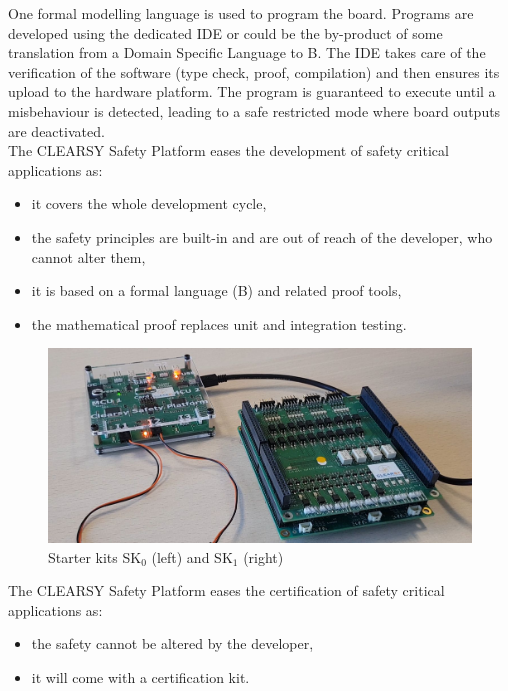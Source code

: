 One formal modelling language is used to program the board. Programs are developed using the dedicated IDE or could be the by-product of some translation from a Domain Specific Language to B. The IDE takes care of the verification of the software (type check, proof, compilation) and then ensures its upload to the hardware platform. The program is guaranteed to execute until a misbehaviour is detected, leading to a safe restricted mode where board outputs are deactivated.\\

The CLEARSY Safety Platform eases the development of safety critical applications as:
\begin{itemize}
    \item it covers the whole development cycle,
    \item the safety principles are built-in and are out of reach of the developer, who cannot alter them,
    \item it is based on a formal language (B) and related proof tools,
    \item the mathematical proof replaces unit and integration testing.\\
\end{itemize}

\begin{figure}[h]
\centering\includegraphics[scale=0.25]{Pictures/INTRO-SK0+SK1.jpg}
\caption{Starter kits SK$_0$ (left) and SK$_1$ (right)}
\end{figure}

%
The CLEARSY Safety Platform eases the certification of safety critical applications as:
\begin{itemize}
    \item the safety cannot be altered by the developer,
    \item it will come with a certification kit.\\
\end{itemize}

